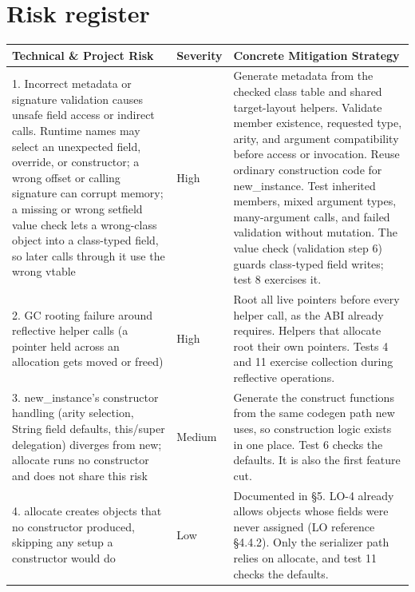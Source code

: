 \section{Risk register}
\begin{center}\small
\begin{tabularx}{\linewidth}{@{}>{\raggedright}p{5.2cm} l X@{}}
\toprule
\textbf{Technical \& Project Risk} & \textbf{Severity} & \textbf{Concrete Mitigation Strategy} \\
\midrule
1. Incorrect metadata or signature validation causes unsafe field access or
  indirect calls. Runtime names may select an unexpected field, override, or
  constructor; a wrong offset or calling signature can corrupt memory; a
  missing or wrong setfield value check lets a wrong-class object into a
  class-typed field, so later calls through it use the wrong vtable &
  High &
  Generate metadata from the checked class table and shared target-layout
  helpers. Validate member existence, requested type, arity, and argument
  compatibility before access or invocation. Reuse ordinary construction code
  for new\_instance. Test inherited members, mixed argument types,
  many-argument calls, and failed validation without mutation. The value
  check (validation step 6) guards class-typed field writes; test 8
  exercises it. \\
\midrule
2. GC rooting failure around reflective helper calls (a pointer held across an
  allocation gets moved or freed) &
  High &
  Root all live pointers before every helper call, as the ABI already
  requires. Helpers that allocate root their own pointers. Tests 4 and 11
  exercise collection during reflective operations. \\
\midrule
3. new\_instance's constructor handling (arity selection, String field
  defaults, this/super delegation) diverges from new; allocate runs no
  constructor and does not share this risk &
  Medium &
  Generate the construct functions from the same codegen path
  new uses, so construction logic exists in one place. Test 6 checks the
  defaults. It is also the first feature cut. \\
\midrule
4. allocate creates objects that no constructor produced, skipping any
  setup a constructor would do &
  Low &
  Documented in \S5. LO-4 already allows objects whose fields were never
  assigned (LO reference \S4.4.2). Only the serializer path relies on
  allocate, and test 11 checks the defaults. \\
\bottomrule
\end{tabularx}
\end{center}

